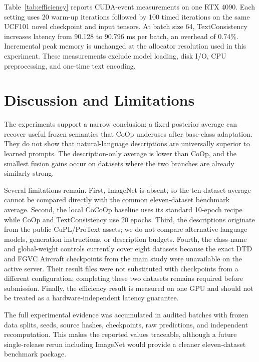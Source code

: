 \documentclass[preprint,12pt]{elsarticle}
\begin{document}


Table~\ref{tab:efficiency} reports CUDA-event measurements on one RTX 4090. Each setting uses 20 warm-up iterations followed by 100 timed iterations on the same UCF101 novel checkpoint and input tensors. At batch size 64, TextConsistency increases latency from 90.128 to 90.796 ms per batch, an overhead of 0.74\%. Incremental peak memory is unchanged at the allocator resolution used in this experiment. These measurements exclude model loading, disk I/O, CPU preprocessing, and one-time text encoding.

\section{Discussion and Limitations}
\label{sec:limitations}

The experiments support a narrow conclusion: a fixed posterior average can recover useful frozen semantics that CoOp underuses after base-class adaptation. They do not show that natural-language descriptions are universally superior to learned prompts. The description-only average is lower than CoOp, and the smallest fusion gains occur on datasets where the two branches are already similarly strong.

Several limitations remain. First, ImageNet is absent, so the ten-dataset average cannot be compared directly with the common eleven-dataset benchmark average. Second, the local CoCoOp baseline uses its standard 10-epoch recipe while CoOp and TextConsistency use 20 epochs. Third, the descriptions originate from the public CuPL/ProText assets; we do not compare alternative language models, generation instructions, or description budgets. Fourth, the class-name and global-weight controls currently cover eight datasets because the exact DTD and FGVC Aircraft checkpoints from the main study were unavailable on the active server. Their result files were not substituted with checkpoints from a different configuration; completing these two datasets remains required before submission. Finally, the efficiency result is measured on one GPU and should not be treated as a hardware-independent latency guarantee.

The full experimental evidence was accumulated in audited batches with frozen data splits, seeds, source hashes, checkpoints, raw predictions, and independent recomputation. This makes the reported values traceable, although a future single-release rerun including ImageNet would provide a cleaner eleven-dataset benchmark package.
\end{document}
